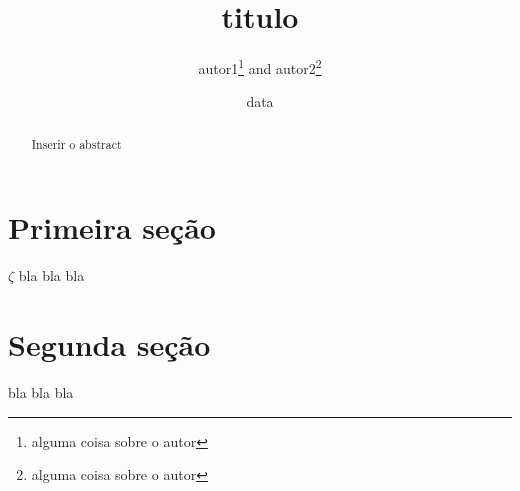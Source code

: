 \documentclass[12pt]{article} %
\title{titulo}
\author{autor1\footnote{alguma coisa sobre o autor} and autor2\footnote{alguma coisa sobre o autor} }
\date{data}
\begin{document}
\maketitle
\begin{abstract}
Inserir o abstract
\end{abstract}

\section{Primeira seção}

$\zeta$ bla bla bla
\section{Segunda seção}

bla bla bla
\end{document}

